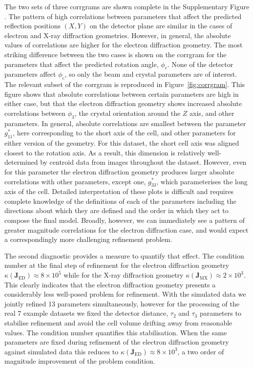 \documentclass[preprint]{iucr}
\newcommand{\mat}[1]{\mathbf{#1}}
\newcounter{DWCounter}
\newcommand{\DW}[1]{%
   \stepcounter{DWCounter}%
   {\color{red}{\textbf{DW \#\arabic{DWCounter}: }#1}}%
  }
\begin{document}
The two sets of three corrgrams are shown complete in the Supplementary Figure
\DW{ref to suppl. fig.}. The pattern of high correlations between parameters
that affect the predicted reflection positions $(X, Y)$ on the detector plane
are similar in the cases of electron and X-ray diffraction geometries. However,
in general, the absolute values of correlations are higher for the electron
diffraction geometry. The most striking difference between the two cases is
shown on the corrgram for the parameters that affect the predicted rotation
angle, $\phi_c$. None of the detector parameters affect $\phi_c$, so only the
beam and crystal parameters are of interest. The relevant subset of the
corrgram is reproduced in Figure~\ref{fig:corrgram}. This figure shows that
absolute correlations between certain parameters are high in either case, but
that the electron diffraction geometry shows increased absolute correlations
between $\phi_3$, the crystal orientation around the $Z$ axis, and other
parameters. In general, absolute correlations are smallest between the
parameter $g^*_{11}$, here corresponding to the short axis of the cell, and
other parameters for either version of the geometry. For this dataset, the
short cell axis was aligned closest to the rotation axis. As a result, this
dimension is relatively well-determined by centroid data from images throughout
the dataset. However, even for this parameter the electron diffraction geometry
produces larger absolute correlations with other parameters, except one,
$g^*_{33}$, which parameterises the long axis of the cell. Detailed
interpretation of these plots is difficult and requires complete knowledge of
the definitions of each of the parameters including the directions about which
they are defined and the order in which they act to compose the final model.
Broadly, however, we can immediately see a pattern of greater magnitude
correlations for the electron diffraction case, and would expect a
correspondingly more challenging refinement problem.

The second diagnostic provides a measure to quantify that effect. The condition
number at the final step of refinement for the electron diffraction geometry
$\kappa \left( \mat{J}_{\textrm{ED}} \right) \approx 8 \times 10^5$ while for
the X-ray diffraction geometry $\kappa \left( \mat{J}_{\textrm{MX}} \right)
\approx 2 \times 10^3$. This clearly indicates that the electron diffraction
geometry presents a considerably less well-posed problem for refinement. With
the simulated data we jointly refined 13 parameters simultaneously, however for
the processing of the real 7 example datasets we fixed the detector distance,
$\tau_2$ and $\tau_3$ parameters to stabilise refinement and avoid the cell
volume drifting away from reasonable values. The condition number quantifies
this stabilisation. When the same parameters are fixed during refinement of the
electron diffraction geometry against simulated data this reduces to $\kappa
\left( \mat{J}_{\textrm{ED}} \right) \approx 8 \times 10^3$, a two order of
magnitude improvement of the problem condition.
\end{document}
